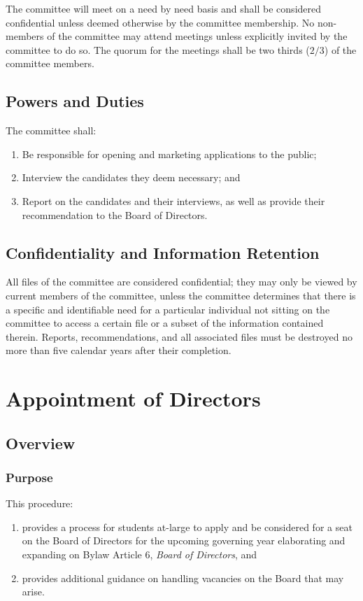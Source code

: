The committee will meet on a need by need basis and shall be considered confidential unless deemed otherwise by the committee membership.
No non-members of the committee may attend meetings unless explicitly invited by the committee to do so.
The quorum for the meetings shall be two thirds ($2/3$) of the committee members.

\subsection{Powers and Duties}

The committee shall:
\begin{enumerate}
	\item Be responsible for opening and marketing applications to the public;
	\item Interview the candidates they deem necessary; and
	\item Report on the candidates and their interviews, as well as provide their recommendation to the Board of Directors.
\end{enumerate}

\subsection{Confidentiality and Information Retention}

All files of the committee are considered confidential; they may only be viewed by current members of the committee, unless the committee determines that there is a specific and identifiable need for a particular individual not sitting on the committee to access a certain file or a subset of the information contained therein.
Reports, recommendations, and all associated files must be destroyed no more than five calendar years after their completion.


\section{Appointment of Directors}
\subsection{Overview}
\subsubsection{Purpose}
This procedure:
\begin{enumerate}
	\item provides a process for students at-large to apply and be considered for a seat on the
	      Board of Directors for the upcoming governing year elaborating and expanding on Bylaw Article 6,
	      \textit{Board of Directors}, and
	\item provides additional guidance on handling vacancies on the Board that may arise.
\end{enumerate}

